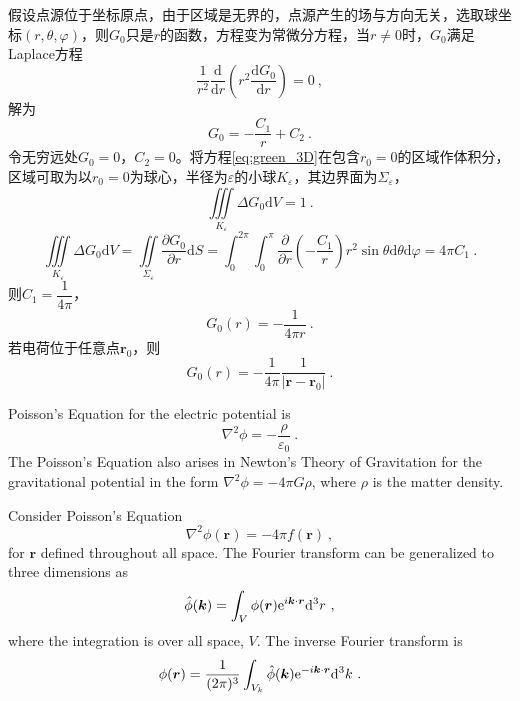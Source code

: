 \documentclass[11pt,a4paper]{article}
\renewcommand{\vec}[1]{\boldsymbol{#1}}
\newcommand{\dif}{\mathrm{d}}
\begin{document}
假设点源位于坐标原点，由于区域是无界的，点源产生的场与方向无关，选取球坐标$(r, \theta, \varphi)$，则$G_0$只是$r$的函数，方程变为常微分方程，当$r\neq 0$时，$G_0$满足Laplace方程
\begin{equation}
\dfrac{1}{r^2} \dfrac{\dif }{\dif r} \left(r^2 \dfrac{\dif G_0}{\dif r} \right) = 0 ~,
\end{equation}
解为
\begin{equation}
G_0 = -\dfrac{C_1}{r} +C_2 ~.
\end{equation}
令无穷远处$G_0 = 0$，$C_2 = 0$。将方程\ref{eq:green_3D}在包含$r_0 = 0$的区域作体积分，区域可取为以$r_0 = 0$为球心，半径为$\varepsilon$的小球$K_\varepsilon$，其边界面为$\Sigma_\varepsilon$，
\begin{equation}
\iiint\limits_{K_\varepsilon} \Delta G_0 \dif V = 1 ~.
\end{equation}
\begin{equation}
\iiint\limits_{K_\varepsilon} \Delta G_0 \dif V = \iint\limits_{\Sigma_\varepsilon} \dfrac{\partial G_0}{\partial r} \dif S = \int_0^{2\pi} \int_{0}^{\pi} \dfrac{\partial }{\partial r} \left(-\dfrac{C_1}{r} \right) r^2 \sin \theta \dif \theta \dif \varphi = 4\pi C_1 ~.
\end{equation}
则$C_1 = \dfrac{1}{4\pi}$，
\begin{equation}
G_0(r)= -\dfrac{1}{4\pi r} ~.
\end{equation}
若电荷位于任意点$\vec{r}_0$，则
\begin{equation}
G_0(r)= -\dfrac{1}{4\pi}  \dfrac{1}{|\vec{r} - \vec{r}_0|} ~.
\end{equation}

\cite{Herman:1742872} Poisson's Equation for the electric potential is
\begin{equation}
\nabla^2 \phi = -\dfrac{\rho}{\varepsilon_0} ~.
\end{equation}
The Poisson's Equation also arises in Newton's Theory of Gravitation for the gravitational potential in the form $\nabla^2 \phi = -4\pi G \rho$, where $\rho$ is the matter density.

Consider Poisson's Equation
\begin{equation}
\nabla^2 \phi(\vec{r}) = -4\pi f(\vec{r}) ~,
\end{equation}
for $\vec{r}$ defined throughout all space. The Fourier transform can be generalized to three dimensions as
\begin{equation}
\hat{\phi}(\vec{k}) = \int_V \phi(\vec{r}) {\rm e}^{i\vec{k}\cdot \vec{r}}\dif^3 r ~,
\end{equation}
where the integration is over all space, $V$. The inverse Fourier transform is
\begin{equation}
\phi(\vec{r}) = \dfrac{1}{(2\pi)^3} \int_{V_k} \hat{\phi}(\vec{k}) {\rm e}^{-i\vec{k}\cdot \vec{r}}\dif^3 k ~.
\end{equation}
\end{document}
